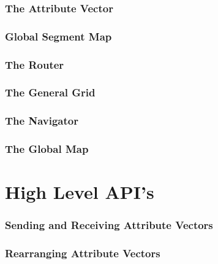 \documentclass{article}
\begin{document}
\section{The Attribute Vector}

\vspace*{\fill}
\newpage
%

\vspace*{\fill}
\newpage
%

\vspace*{\fill}
\newpage
%
%
\section{Global Segment Map}

\vspace*{\fill}
\newpage
%

\vspace*{\fill}
\newpage
%
%
\section{The Router}

\vspace*{\fill}
\newpage
%
%
\section{The General Grid}

\vspace*{\fill}
\newpage
%

\vspace*{\fill}
\newpage
%
%
\section{The Navigator}

\vspace*{\fill}
\newpage
%
%
\section{The Global Map}

\vspace*{\fill}
\newpage
%
%
\part{High Level API's}
%
\section{Sending and Receiving Attribute Vectors}

\vspace*{\fill}
\newpage
%
\section{Rearranging Attribute Vectors}

\vspace*{\fill}
\newpage
%
\end{document}

